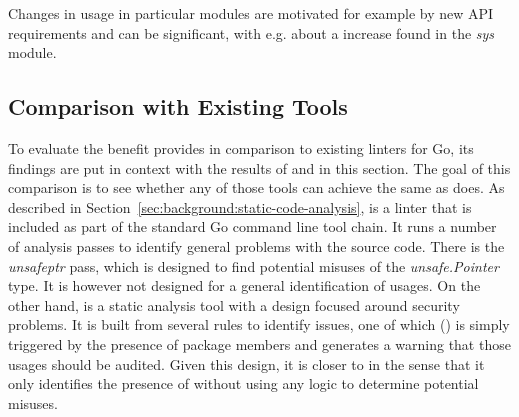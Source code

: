 \begin{tcolorbox}[boxsep=3pt, enlarge top by=5pt, title=Answer to~\ref{rq:changeTime}]
    Changes in \unsafe{} usage in particular modules are motivated for example by new \acrshort{API} requirements and
    can be significant, with e.g. about a \sysModuleUnsafeIncreaseRounded{} increase found in the
    \textit{sys} module.
\end{tcolorbox}



\subsection{Comparison with Existing Tools}\label{subsec:go-geiger:evaluation:linters-comparison}

To evaluate the benefit \toolGeiger{} provides in comparison to existing linters for Go, its findings are put in context
with the results of \toolVet{} and \toolGosec{} in this section.
The goal of this comparison is to see whether any of those tools can achieve the same as \toolGeiger{} does.
As described in Section~\ref{sec:background:static-code-analysis}, \toolVet{} is a linter that is included as part of
the standard Go command line tool chain.
It runs a number of analysis passes to identify general problems with the source code.
There is the \textit{unsafeptr} pass, which is designed to find potential misuses of the \textit{unsafe.Pointer} type.
It is however not designed for a general identification of \unsafe{} usages.
On the other hand, \toolGosec{} is a static analysis tool with a design focused around security problems.
It is built from several rules to identify issues, one of which (\textit{}) is simply triggered by the
presence of \unsafe{} package members and generates a warning that those usages should be audited.
Given this design, it is closer to \toolGeiger{} in the sense that it only identifies the presence of \unsafe{} without
using any logic to determine potential misuses.


